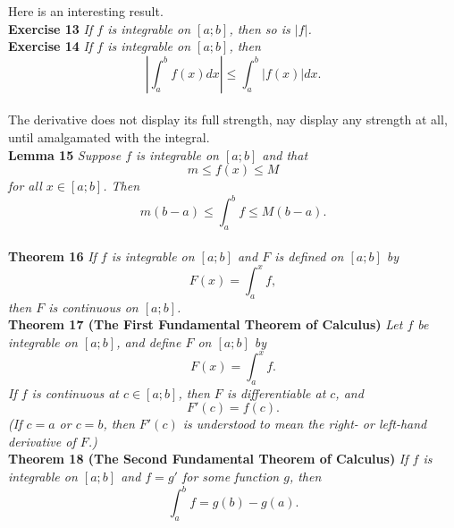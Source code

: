 \documentclass{article}
\begin{document}
Here is an interesting result.\\

\noindent \textbf{Exercise 13}
\textit{If $f$ is integrable on $[a;b]$, then so is $|f|$.}\\

\noindent \textbf{Exercise 14}
\textit{If $f$ is integrable on $[a;b]$, then
\[
\left | \int_a^b f(x) dx \right | \leq \int_a^b |f(x)| dx.
\]}\\

The derivative does not display its full strength, nay display any strength at all, until amalgamated with the integral.\\

\noindent \textbf{Lemma 15}
\textit{Suppose $f$ is integrable on $[a;b]$ and that
\[
m \leq f(x) \leq M
\]
for all $x \in [a;b]$. Then
\[
m (b-a) \leq \int_a^b f \leq M (b-a).
\]}\\

\noindent \textbf{Theorem 16}
\textit{If $f$ is integrable on $[a;b]$ and $F$ is defined on $[a;b]$ by
\[
F(x) = \int_a^x f,
\]
then $F$ is continuous on $[a;b]$.}\\

\noindent \textbf{Theorem 17 (The First Fundamental Theorem of Calculus)}
\textit{Let $f$ be integrable on $[a;b]$, and define $F$ on $[a;b]$ by
\[
F(x) = \int_a^x f.
\]
If $f$ is continuous at $c \in [a;b]$, then $F$ is differentiable at $c$, and
\[
F'(c) = f(c).
\]
(If $c=a$ or $c=b$, then $F'(c)$ is understood to mean the right- or left-hand derivative of $F$.)}\\

\noindent \textbf{Theorem 18 (The Second Fundamental Theorem of Calculus)}
\textit{If $f$ is integrable on $[a;b]$ and $f=g'$ for some function $g$, then
\[
\int_a^b f = g(b)-g(a).
\]}\\
\end{document}

